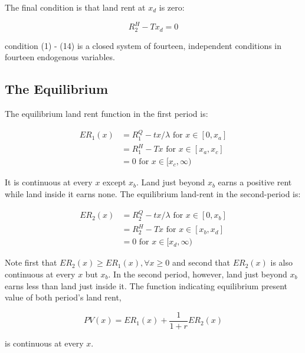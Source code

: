 The final condition is that land rent at $x_d$ is zero:

\begin{equation}
    R_2^H - Tx_d = 0
\end{equation}

condition (1) - (14) is a closed system of fourteen, independent conditions in fourteen endogenous variables.

\subsection{The Equilibrium}

The equilibrium land rent function in the first period is:

\begin{equation*}
    \begin{aligned}
        ER_1(x) & = R_1^Q - tx / \lambda \text{ for } x \in [0, x_a] \\
        & = R_1^H - Tx \text{ for } x \in [x_a, x_c] \\
        & = 0 \text{ for } x \in [x_c, \infty)
    \end{aligned}
\end{equation*}

It is continuous at every $x$ except $x_b$. Land just beyond $x_b$ earns a positive rent while land inside it earns none. The equilibrium land-rent in the second-period is:

\begin{equation*}
    \begin{aligned}
        ER_2(x) & = R_2^Q - tx / \lambda \text{ for } x \in [0, x_b] \\
        & = R_2^H - Tx \text{ for } x \in [x_b, x_d] \\
        & = 0 \text{ for } x \in [x_d, \infty)
    \end{aligned}
\end{equation*}

Note first that $ER_2(x) \geq ER_1(x), \forall x \geq 0$ and second that $ER_2(x)$ is also continuous at every $x$ but $x_b$. In the second period, however, land just beyond $x_b$ earns less than land just inside it. The function indicating equilibrium present value of both period's land rent,

\begin{equation*}
    PV(x) = ER_1(x) + \frac{1}{1 + r}ER_2(x)
\end{equation*}

is continuous at every $x$.

